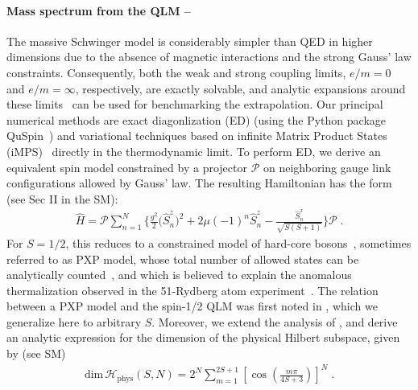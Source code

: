 \documentclass[aps,prl,reprint,twocolumn,superscriptaddress,floatfix,nofootinbib]{revtex4-1}
\begin{document}
	\paragraph{Mass spectrum from the QLM --}
	The massive Schwinger model is considerably simpler than QED in higher dimensions due to the absence of magnetic interactions and the strong Gauss' law constraints. Consequently, both the weak and strong coupling limits, $e/m = 0$ and $e/m=\infty$, respectively, are exactly solvable, and analytic expansions around these limits~\cite{Hamer:1997dx,sriganesh2000new} can be used for benchmarking the extrapolation. Our principal numerical methods are exact diagonlization (ED) (using the Python package QuSpin~\cite{weinberg2019quspin}) and variational techniques based on infinite Matrix Product States (iMPS)~\cite{zauner2018variational,haegeman2012variational} directly in the thermodynamic limit. To perform ED, we derive an equivalent spin model constrained by a projector $\mathcal{P}$ on neighboring gauge link configurations allowed by Gauss' law. The resulting Hamiltonian has the form (see Sec II in the SM):
	\begin{align}\label{eq:spin_model}
		\hat{H} = \mathcal{P} \sum_{n=1}^{N} \bigg\lbrace \frac{g^2}{2} \big(\hat{S}^z_{n}\big)^2 +  2\mu(-1)^n  \hat{S}^z_{n}   - \frac{\hat{S}^x_{n} }{\sqrt{S(S+1)}}  \bigg\rbrace \mathcal{P} \;.
	\end{align}
	For $S=1/2$, this reduces to a constrained model of hard-core bosons~\cite{Fendley2004}, sometimes referred to as PXP model, whose total number of allowed states can be analytically counted~\cite{Turner2018}, and which is believed to explain the anomalous thermalization observed in the 51-Rydberg atom experiment~\cite{bernien2017probing}. The relation between a PXP model and the spin-1/2 QLM was first noted in \cite{surace2020lattice}, which we generalize here to arbitrary $S$. Moreover, we extend the analysis of \cite{Turner2018}, and derive an analytic expression for the dimension of the physical Hilbert subspace, given by (see SM)
	\begin{align}\label{eq:H_dim}
		\text{dim} \, \mathcal{H}_\text{phys} (S,N) = 2^N \sum_{m=1}^{2S+1} \left[\cos \left(\frac{m\pi}{4S + 3}\right)\right]^N \;.
	\end{align}
\end{document}
